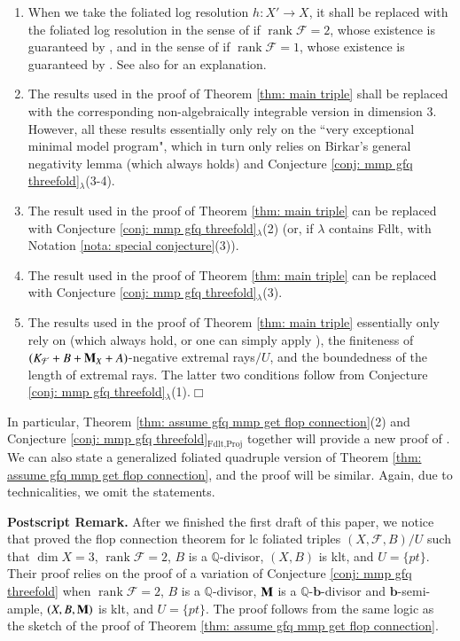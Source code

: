 \documentclass[preprint,12pt]{elsarticle}
\newcommand{\bb}{\bm{b}}
\newcommand{\Mm}{{\bf{M}}}
\newcommand{\Qq}{\mathbb{Q}}
\newcommand{\rk}{\operatorname{rank}}
\newcommand{\Ff}{\mathcal{F}}
\begin{document}
\begin{enumerate} 
\item When we take the foliated log resolution $h: X'\rightarrow X$, it shall be replaced with the foliated log resolution in the sense of \cite[Definition 3.1]{CS21} if $\rk\Ff=2$, whose existence is guaranteed by \cite{Can04}, and in the sense of \cite[Definition 4.4]{LLM23} if $\rk\Ff=1$, whose existence is guaranteed by \cite{MP13}. See also \cite[Theorem 4.5]{LLM23} for an explanation. 
\item The results \cite[Lemma 4.13, A.25, A.28]{LMX24b} used in the proof of Theorem \ref{thm: main triple} shall be replaced with the corresponding non-algebraically integrable version in dimension 3. However, all these results essentially only rely on the ``very exceptional minimal model program", which in turn only relies on Birkar's general negativity lemma \cite[Lemma 3.3]{Bir12} (which always holds) and Conjecture \ref{conj: mmp gfq threefold}{$_\lambda$}(3-4). \item The result \cite[Theorem 7.2]{LMX24b} used in the proof of Theorem \ref{thm: main triple} can be replaced with Conjecture \ref{conj: mmp gfq threefold}{$_\lambda$}(2) (or, if $\lambda$ contains Fdlt, with Notation \ref{nota: special conjecture}(3)). 
\item The result \cite[Theorem A.13]{LMX24b} used in the proof of Theorem \ref{thm: main triple} can be replaced with Conjecture \ref{conj: mmp gfq threefold}{$_\lambda$}(3). 
\item The results \cite[Theorem 1.12, Lemma B.6]{LMX24b} used in the proof of Theorem \ref{thm: main triple} essentially only rely on \cite[Lemma 5.3]{HLS19} (which always hold, or one can simply apply \cite[Theorem 1.2]{LMX24a}), the finiteness of $(K_{\Ff}+B+\Mm_X+A)$-negative extremal rays$/U$, and the boundedness of the length of extremal rays. The latter two conditions follow from Conjecture \ref{conj: mmp gfq threefold}{$_\lambda$}(1).\hfill$\Box$ \end{enumerate}

In particular, Theorem \ref{thm: assume gfq mmp get flop connection}(2) and Conjecture \ref{conj: mmp gfq threefold}$_{\text{Fdlt,Proj}}$ together will provide a new proof of \cite[Theorem 1.1]{JV23}. We can also state a generalized foliated quadruple version of Theorem \ref{thm: assume gfq mmp get flop connection}, and the proof will be similar. Again, due to technicalities, we omit the statements.

\noindent\textbf{Postscript Remark.} After we finished the first draft of this paper, we notice that \cite[Theorem 8.1]{CM24} proved the flop connection theorem for lc foliated triples $(X,\Ff,B)/U$ such that $\dim X=3$, $\rk\Ff=2$, $B$ is a $\Qq$-divisor, $(X,B)$ is klt, and $U=\{pt\}$. Their proof relies on the proof of a variation of Conjecture \ref{conj: mmp gfq threefold} when $\rk\Ff=2$, $B$ is a $\Qq$-divisor, $\Mm$ is a $\Qq$-$\bb$-divisor and $\bb$-semi-ample, $(X,B,\Mm)$ is klt, and $U=\{pt\}$. The proof follows from the same logic as the sketch of the proof of Theorem \ref{thm: assume gfq mmp get flop connection}.
\end{document}
